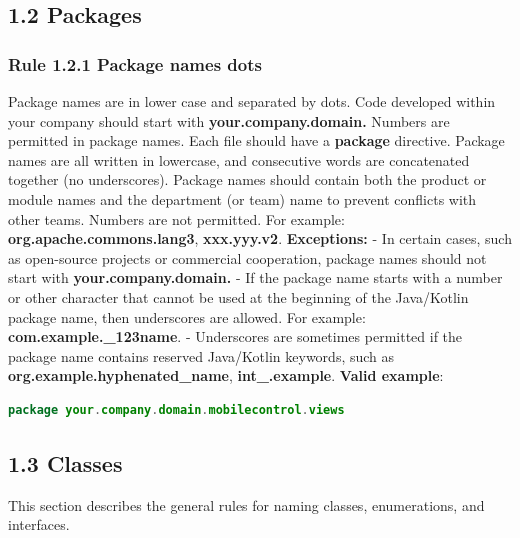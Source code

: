 \subsection*{\textbf{1.2 Packages}}
\label{sec:1.2}
\subsubsection*{\textbf{Rule 1.2.1 Package names dots}}
\leavevmode\newline
Package names are in lower case and separated by dots. Code developed within your company should start with \textbf{your.company.domain.} Numbers are permitted in package names.
Each file should have a \textbf{package} directive.
Package names are all written in lowercase, and consecutive words are concatenated together (no underscores). Package names should contain both the product or module names and the department (or team) name to prevent conflicts with other teams.  Numbers are not permitted. For example: \textbf{org.apache.commons.lang3}, \textbf{xxx.yyy.v2}.
\textbf{Exceptions:}
- In certain cases, such as open-source projects or commercial cooperation, package names should not start with \textbf{your.company.domain.}
- If the package name starts with a number or other character that cannot be used at the beginning of the Java/Kotlin package name, then underscores are allowed. For example: \textbf{com.example.\_123name}.
- Underscores are sometimes permitted if the package name contains reserved Java/Kotlin keywords, such as \textbf{org.example.hyphenated\_name}, \textbf{int\_.example}.
\textbf{Valid example}:
\begin{lstlisting}[language=Kotlin]
package your.company.domain.mobilecontrol.views
\end{lstlisting}
\subsection*{\textbf{1.3 Classes}}
\label{sec:1.3}
This section describes the general rules for naming classes, enumerations, and interfaces.
